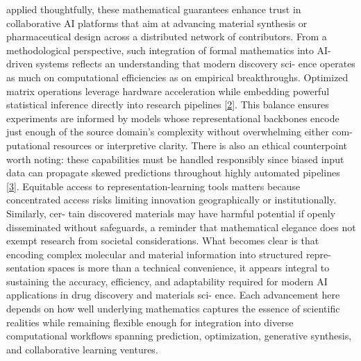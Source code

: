 \documentclass[
]{article}
\begin{document}
applied thoughtfully, these mathematical guarantees enhance trust in
collaborative AI platforms that aim at advancing material synthesis or
pharmaceutical design across a distributed network of contributors. From
a methodological perspective, such integration of formal mathematics
into AI-driven systems reflects an understanding that modern discovery
sci- ence operates as much on computational efficiencies as on empirical
breakthroughs. Optimized matrix operations leverage hardware
acceleration while embedding powerful statistical inference directly
into research pipelines {[}\protect\hyperlink{_bookmark42}{2}{]}. This
balance ensures experiments are informed by models whose
representational backbones encode just enough of the source domain's
complexity without overwhelming either com- putational resources or
interpretive clarity. There is also an ethical counterpoint worth
noting: these capabilities must be handled responsibly since biased
input data can propagate skewed predictions throughout highly automated
pipelines {[}\protect\hyperlink{_bookmark43}{3}{]}. Equitable access to
representation-learning tools matters because concentrated access risks
limiting innovation geographically or institutionally. Similarly, cer-
tain discovered materials may have harmful potential if openly
disseminated without safeguards, a reminder that mathematical elegance
does not exempt research from societal considerations. What becomes
clear is that encoding complex molecular and material information into
structured repre- sentation spaces is more than a technical convenience,
it appears integral to sustaining the accuracy, efficiency, and
adaptability required for modern AI applications in drug discovery and
materials sci- ence. Each advancement here depends on how well
underlying mathematics captures the essence of scientific realities
while remaining flexible enough for integration into diverse
computational workflows spanning prediction, optimization, generative
synthesis, and collaborative learning ventures.
\end{document}
